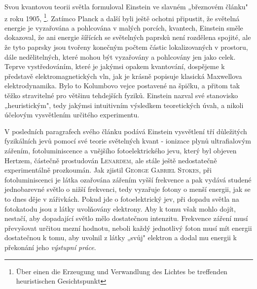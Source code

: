         Svou kvantovou teorii světla formuloval Einstein ve slavném „březnovém článku" z roku 1905,
        \emph{}\footnote{Über einen
        die Erzeugung und Verwandlung des Lichtes be treffenden heuristischen Gesichtspunkt}.
        Zatímco Planck a další byli ještě ochotni připustit, že světelná energie je vyzařována a
        pohlcována v malých porcích, kvantech, Einstein směle dokazoval, že ani energie šířících se
        světelných paprsků není rozdělena spojité, ale že tyto paprsky jsou tvořeny konečným počtem
        částic lokalizovaných v prostoru, dále nedělitelných, které mohou být vyzařovány a
        pohlcovány jen jako celek. Teprve vystředováním, které je jakýmsi opakem kvantování,
        dospějeme k představě elektromagnetických vln, jak je krásně popisuje klasická Maxwellova
        elektrodynamika. Bylo to Kolumbovo vejce postavené na špičku, a přitom tak těžko stravitelné
        pro většinu tehdejších fyziků. Einstein nazval své stanovisko „heuristickým", tedy jakýmsi
        intuitivním výsledkem teoretických úvah, a nikoli účelovým vysvětlením určitého experimentu.

        \begin{tcnote}
          V posledních paragrafech svého článku podává Einstein vysvětlení tří důležitých
          fyzikálních jevů pomocí své teorie světelných kvant - ionizace plynů ultrafialovým
          zářením, fotoluminiscence a vnějšího fotoelektrického jevu, který byl objeven Hertzem,
          částečně prostudován \textsc{Lenardem}, ale stále ještě nedostatečně experimentálně
          prozkoumán. Jak zjistil \textsc{George Gabriel Stokes}, při fotoluminiscenci je látka
          ozařována zářením vyšší frekvence a pak vydává studené jednobarevné světlo o nižší
          frekvenci, tedy vyzařuje fotony o menší energii, jak se to dnes děje v zářivkách. Pokud
          jde o fotoelektrický jev, při dopadu světla na fotokatodu jsou z látky uvolňovány
          elektrony. Aby k tomu však mohlo dojít, nestačí, aby dopadající světlo mělo dostatečnou
          intenzitu. Frekvence záření musí převyšovat určitou mezní hodnotu, neboli každý jednotlivý
          foton musí mít energii dostatečnou k tomu, aby uvolnil z látky „svůj" elektron a dodal mu
          energii k překonání jeho \emph{výstupní práce}.
        \end{tcnote}

